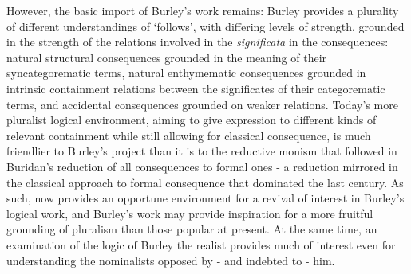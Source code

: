 \documentclass[]{birkjour}
\begin{document}
However, the basic import of Burley's work remains: Burley provides a plurality of different understandings of `follows', with differing levels of strength, grounded in the strength of the relations involved in the \textit{significata} in the consequences: natural structural consequences grounded in the meaning of their syncategorematic terms, natural enthymematic consequences grounded in intrinsic containment relations between the significates of their categorematic terms, and accidental consequences grounded on weaker relations. Today's more pluralist logical environment, aiming to give expression to different kinds of relevant containment while still allowing for classical consequence, is much friendlier to Burley's project than it is to the reductive monism that followed in Buridan's reduction of all consequences to formal ones - a reduction mirrored in the classical approach to formal consequence that dominated the last century. As such, now provides an opportune environment for a revival of interest in Burley's logical work, and Burley's work may provide inspiration for a more fruitful grounding of pluralism than those popular at present. At the same time, an examination of the logic of Burley the realist provides much of interest even for understanding the nominalists opposed by - and indebted to - him.

\end{document}
